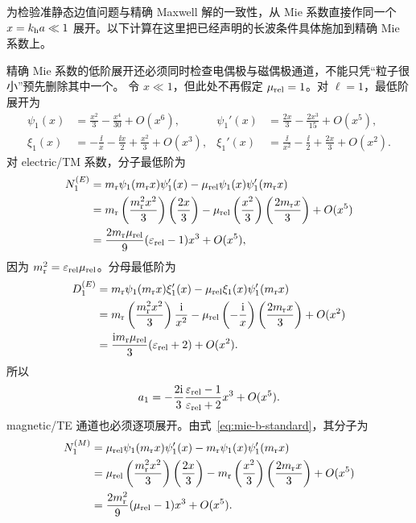 为检验准静态边值问题与精确 Maxwell 解的一致性，从 Mie 系数直接作同一个 $x=k_{\rm h}a\ll1$ 展开。以下计算在这里把已经声明的长波条件具体施加到精确 Mie 系数上。

精确 Mie 系数的低阶展开还必须同时检查电偶极与磁偶极通道，不能只凭“粒子很小”预先删除其中一个。
令
$x\ll1$，但此处不再假定 $\mu_{\rm rel}=1$。对 $\ell=1$，最低阶展开为
\begin{align}
\psi_1(x)
&=\frac{x^2}{3}-\frac{x^4}{30}+O(x^6),
&
\psi_1'(x)
&=\frac{2x}{3}-\frac{2x^3}{15}+O(x^5),
\\
\xi_1(x)
&=-\frac{\ii}{x}-\frac{\ii x}{2}
+\frac{x^2}{3}+O(x^3),
&
\xi_1'(x)
&=\frac{\ii}{x^2}-\frac{\ii}{2}
+\frac{2x}{3}+O(x^2).
\end{align}
对 electric/TM 系数，分子最低阶为
\begin{align}
N_1^{(E)}
&=m_{\rm r}\psi_1(m_{\rm r}x)\psi_1'(x)
-\mu_{\rm rel}\psi_1(x)\psi_1'(m_{\rm r}x)
\\
&=m_{\rm r}
\left(\frac{m_{\rm r}^2x^2}{3}\right)
\left(\frac{2x}{3}\right)
-\mu_{\rm rel}
\left(\frac{x^2}{3}\right)
\left(\frac{2m_{\rm r}x}{3}\right)
+O(x^5)
\\
&=\frac{2m_{\rm r}\mu_{\rm rel}}{9}
(\varepsilon_{\rm rel}-1)x^3+O(x^5),
\end{align}
因为 $m_{\rm r}^2=\varepsilon_{\rm rel}\mu_{\rm rel}$。分母最低阶为
\begin{align}
D_1^{(E)}
&=m_{\rm r}\psi_1(m_{\rm r}x)\xi_1'(x)
-\mu_{\rm rel}\xi_1(x)\psi_1'(m_{\rm r}x)
\\
&=m_{\rm r}
\left(\frac{m_{\rm r}^2x^2}{3}\right)
\frac{\mathrm{i}}{x^2}
-\mu_{\rm rel}
\left(-\frac{\mathrm{i}}{x}\right)
\left(\frac{2m_{\rm r}x}{3}\right)
+O(x^2)
\\
&=\frac{\mathrm{i} m_{\rm r}\mu_{\rm rel}}{3}
(\varepsilon_{\rm rel}+2)+O(x^2).
\end{align}
所以
\begin{equation}
{
a_1
=-\frac{2\mathrm{i}}{3}
\frac{\varepsilon_{\rm rel}-1}
{\varepsilon_{\rm rel}+2}x^3
+O(x^5).}
\label{eq:mie-rayleigh-a-general}
\end{equation}
magnetic/TE 通道也必须逐项展开。由式~\cref{eq:mie-b-standard}，其分子为
\begin{align}
N_1^{(M)}
&=\mu_{\rm rel}\psi_1(m_{\rm r}x)\psi_1'(x)
-m_{\rm r}\psi_1(x)\psi_1'(m_{\rm r}x)\\
&=\mu_{\rm rel}
\left(\frac{m_{\rm r}^2x^2}{3}\right)
\left(\frac{2x}{3}\right)
-m_{\rm r}
\left(\frac{x^2}{3}\right)
\left(\frac{2m_{\rm r}x}{3}\right)
+O(x^5)\\
&=\frac{2m_{\rm r}^2}{9}(\mu_{\rm rel}-1)x^3+O(x^5).
\end{align}
